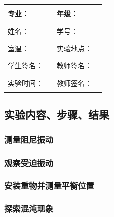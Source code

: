 \documentclass[dvipsnames, svgnames,a4paper,11pt]{article}
\newcommand{\recordblank}[1]{\par\vspace*{#1}\par}
\begin{document}
\clearpage
\noindent\begin{minipage}{\textwidth}
	\renewcommand\arraystretch{1.7}
	\begin{tabularx}{\textwidth}{|X|X|X|X|}
	\hline
	专业：& \rule{2.5cm}{0.4pt} & 年级：& \rule{2.5cm}{0.4pt}\\
	\hline
	姓名：& \rule{2.5cm}{0.4pt} & 学号：& \rule{2.5cm}{0.4pt}\\
	\hline
	室温：& \rule{2.5cm}{0.4pt} & 实验地点：& \rule{2.5cm}{0.4pt}\\
	\hline
	学生签名：& \rule{2.5cm}{0.4pt} & 教师签名：& \rule{2.5cm}{0.4pt}\\
	\hline
	实验时间：& \rule{2.5cm}{0.4pt} & 教师签名：& \rule{2.5cm}{0.4pt}\\
	\hline
	\end{tabularx}
\vspace{0.8em}

\subsection{实验内容、步骤、结果}

\subsubsection{测量阻尼振动}
\end{minipage}


\recordblank{7cm}



\subsubsection{观察受迫振动}


\recordblank{7cm}


\recordblank{7cm}

\clearpage

\subsubsection{安装重物并测量平衡位置}
\recordblank{5.0cm}
\subsubsection{探索混沌现象}



\recordblank{7cm}

\recordblank{7cm}

\recordblank{7cm}
\end{document}
